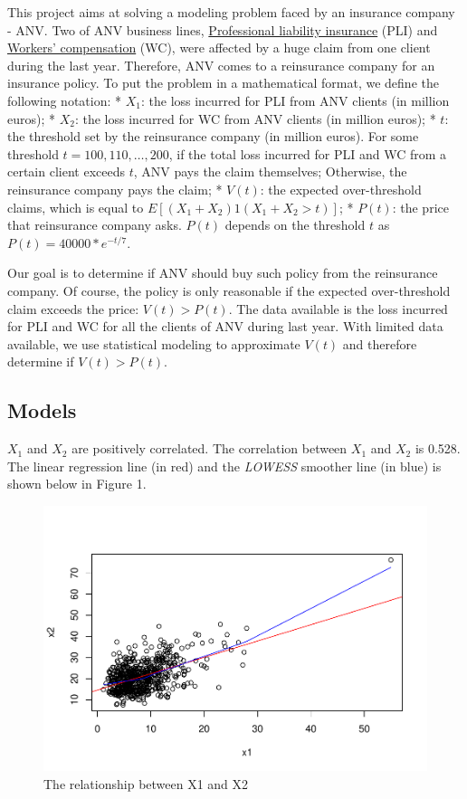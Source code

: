 \documentclass[11pt,]{article}
\begin{document}
This project aims at solving a modeling problem faced by an insurance
company - ANV. Two of ANV business lines,
\href{https://en.wikipedia.org/wiki/Professional_liability_insurance}{Professional
liability insurance} (PLI) and
\href{https://en.wikipedia.org/wiki/Workers\%27_compensation}{Workers'
compensation} (WC), were affected by a huge claim from one client during
the last year. Therefore, ANV comes to a reinsurance company for an
insurance policy. To put the problem in a mathematical format, we define
the following notation: * \(X_1\): the loss incurred for PLI from ANV
clients (in million euros); * \(X_2\): the loss incurred for WC from ANV
clients (in million euros); * \(t\): the threshold set by the
reinsurance company (in million euros). For some threshold
\(t = 100,110,…,200\), if the total loss incurred for PLI and WC from a
certain client exceeds \(t\), ANV pays the claim themselves; Otherwise,
the reinsurance company pays the claim; * \(V(t)\): the expected
over-threshold claims, which is equal to \(E[(X_1+X_2)1(X_1+X_2>t)]\); *
\(P(t)\): the price that reinsurance company asks. \(P(t)\) depends on
the threshold \(t\) as \(P(t)=40000 * e^{-t/7}\).

Our goal is to determine if ANV should buy such policy from the
reinsurance company. Of course, the policy is only reasonable if the
expected over-threshold claim exceeds the price: \(V(t) > P(t)\). The
data available is the loss incurred for PLI and WC for all the clients
of ANV during last year. With limited data available, we use statistical
modeling to approximate \(V(t)\) and therefore determine if
\(V(t) > P(t)\).

\hypertarget{models}{%
\subsection{Models}\label{models}}

\(X_1\) and \(X_2\) are positively correlated. The correlation between
\(X_1\) and \(X_2\) is 0.528. The linear regression line (in red) and
the \emph{LOWESS} smoother line (in blue) is shown below in Figure 1.

\begin{figure}
\centering
\includegraphics{figs/unnamed-chunk-2.pdf}
\caption{The relationship between X1 and X2}
\end{figure}
\end{document}
